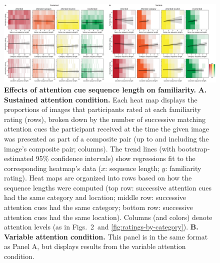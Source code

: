 \documentclass{article}
\newcommand{\familiarity}{2}
\begin{document}
\begin{figure}[tp]
  \centering
  \includegraphics[width=1\textwidth]{figs/sequence_length_effects}

\caption{\textbf{Effects of attention cue sequence length on familiarity.} 
\textbf{A. Sustained attention condition.} Each heat map
displays the proportions of images that participants rated at each familiarity
rating (rows), broken down by the number of successive matching attention cues
the participant received at the time the given image was presented as part of a
composite pair (up to and including the image's composite pair; columns). The
trend lines (with bootstrap-estimated 95\% confidence intervals) show
regressions fit to the corresponding heatmap's data ($x$: sequence length; $y$:
familiarity rating). Heat maps are organized into rows based on how the sequence
lengths were computed (top row: successive attention cues had the same category
and location; middle row: successive attention cues had the same category;
bottom row: successive attention cues had the same location). Columns (and
colors) denote attention levels (as in Figs.~\familiarity~and
\ref{fig:ratings-by-category}). \textbf{B. Variable attention
condition.} This panel is in the same format as Panel A, but displays results
from the variable attention condition.}

\label{fig:sequence-effects}
\end{figure}
\end{document}
